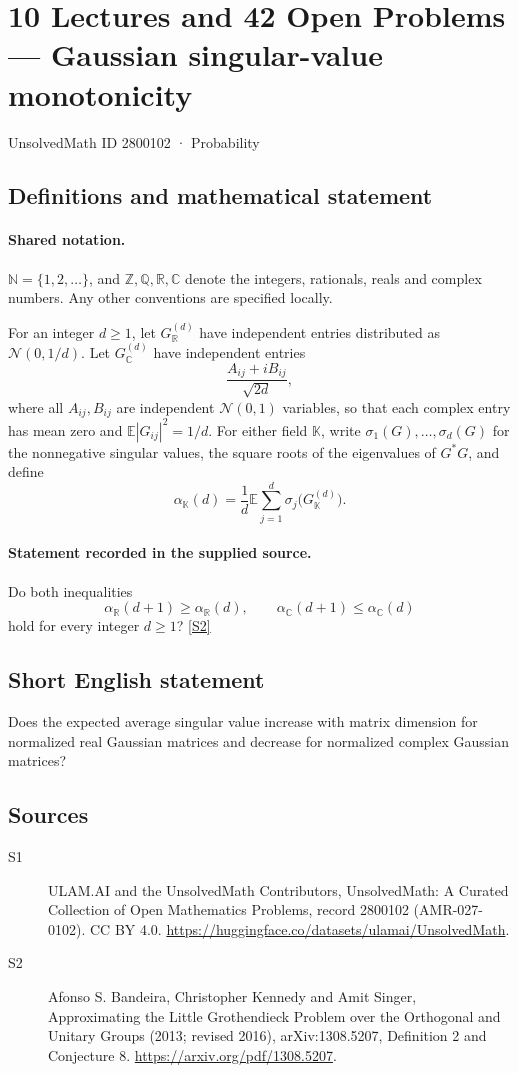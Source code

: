 \documentclass[11pt]{article}
\newcommand{\sref}[2]{\hyperlink{source:#1:#2}{[S#2]}}
\begin{document}
\setcounter{section}{2800101}
\section{10 Lectures and 42 Open Problems — Gaussian singular-value monotonicity}\label{2800102}
{\small\sffamily UnsolvedMath ID 2800102 · Probability}
\subsection{Definitions and mathematical statement}

\paragraph{Shared notation.}$\mathbb N=\{1,2,\ldots\}$, and $\mathbb Z,\mathbb Q,\mathbb R,\mathbb C$ denote the integers, rationals, reals and complex numbers. Any other conventions are specified locally.


For an integer \(d\ge1\), let \(G_{\mathbb R}^{(d)}\) have independent entries distributed as \(\mathcal N(0,1/d)\). Let \(G_{\mathbb C}^{(d)}\) have independent entries
\[\frac{A_{ij}+iB_{ij}}{\sqrt{2d}},\]
where all \(A_{ij},B_{ij}\) are independent \(\mathcal N(0,1)\) variables, so that each complex entry has mean zero and \(\mathbb E|G_{ij}|^2=1/d\). For either field \(\mathbb K\), write \(\sigma_1(G),\ldots,\sigma_d(G)\) for the nonnegative singular values, the square roots of the eigenvalues of \(G^*G\), and define
\[\alpha_{\mathbb K}(d)=\frac1d\mathbb E\sum_{j=1}^d\sigma_j\bigl(G_{\mathbb K}^{(d)}\bigr).\]
\paragraph{Statement recorded in the supplied source.}
Do both inequalities
\[\alpha_{\mathbb R}(d+1)\ge\alpha_{\mathbb R}(d),\qquad
  \alpha_{\mathbb C}(d+1)\le\alpha_{\mathbb C}(d)\]
hold for every integer \(d\ge1\)? \sref{2800102}{2}
\subsection{Short English statement}
Does the expected average singular value increase with matrix dimension for normalized real Gaussian matrices and decrease for normalized complex Gaussian matrices?
\subsection{Sources}
\begin{description}
\item[\hypertarget{source:2800102:1}{S1}] ULAM.AI and the UnsolvedMath Contributors, UnsolvedMath: A Curated Collection of Open Mathematics Problems, record 2800102 (AMR-027-0102). CC BY 4.0. \url{https://huggingface.co/datasets/ulamai/UnsolvedMath}.
\item[\hypertarget{source:2800102:2}{S2}] Afonso S. Bandeira, Christopher Kennedy and Amit Singer, Approximating the Little Grothendieck Problem over the Orthogonal and Unitary Groups (2013; revised 2016), arXiv:1308.5207, Definition 2 and Conjecture 8. \url{https://arxiv.org/pdf/1308.5207}.
\end{description}
\label{end:2800102}
\end{document}
